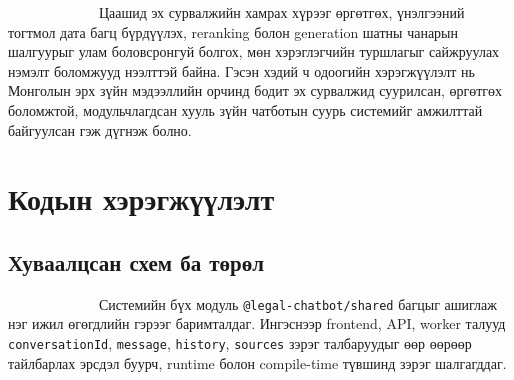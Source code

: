 \documentclass[12pt,A4]{report}
\begin{document}
\ \ \ \ \ \ \ \ \  \ \ \ \ Цаашид эх сурвалжийн хамрах хүрээг өргөтгөх, үнэлгээний тогтмол дата багц бүрдүүлэх, reranking болон generation шатны чанарын шалгуурыг улам боловсронгуй болгох, мөн хэрэглэгчийн туршлагыг сайжруулах нэмэлт боломжууд нээлттэй байна. Гэсэн хэдий ч одоогийн хэрэгжүүлэлт нь Монголын эрх зүйн мэдээллийн орчинд бодит эх сурвалжид суурилсан, өргөтгөх боломжтой, модульчлагдсан хууль зүйн чатботын суурь системийг амжилттай байгуулсан гэж дүгнэж болно.


\singlespace
{}




\appendix
{}

\clearpage
\chapter{Кодын хэрэгжүүлэлт}
\markboth{}{}

\section{Хуваалцсан схем ба төрөл}

\ \ \ \ \ \ \ \ \  \ \ \ \ Системийн бүх модуль
\texttt{@legal-chatbot/shared} багцыг ашиглаж нэг ижил
өгөгдлийн гэрээг баримталдаг. Ингэснээр frontend, API,
worker талууд \texttt{conversationId}, \texttt{message},
\texttt{history}, \texttt{sources} зэрэг талбаруудыг өөр өөрөөр
тайлбарлах эрсдэл буурч, runtime болон compile-time түвшинд
зэрэг шалгагддаг.
\end{document}
